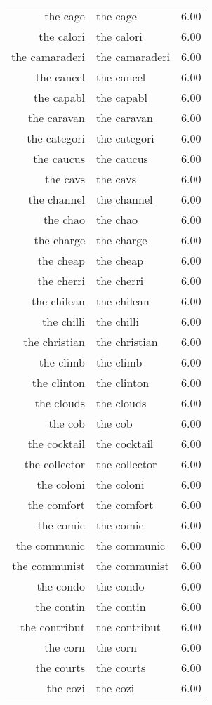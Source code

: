 \begin{table}[ht]
\begin{tabular}{rlr}
  the cage & the cage & 6.00 \\ 
  the calori & the calori & 6.00 \\ 
  the camaraderi & the camaraderi & 6.00 \\ 
  the cancel & the cancel & 6.00 \\ 
  the capabl & the capabl & 6.00 \\ 
  the caravan & the caravan & 6.00 \\ 
  the categori & the categori & 6.00 \\ 
  the caucus & the caucus & 6.00 \\ 
  the cavs & the cavs & 6.00 \\ 
  the channel & the channel & 6.00 \\ 
  the chao & the chao & 6.00 \\ 
  the charge & the charge & 6.00 \\ 
  the cheap & the cheap & 6.00 \\ 
  the cherri & the cherri & 6.00 \\ 
  the chilean & the chilean & 6.00 \\ 
  the chilli & the chilli & 6.00 \\ 
  the christian & the christian & 6.00 \\ 
  the climb & the climb & 6.00 \\ 
  the clinton & the clinton & 6.00 \\ 
  the clouds & the clouds & 6.00 \\ 
  the cob & the cob & 6.00 \\ 
  the cocktail & the cocktail & 6.00 \\ 
  the collector & the collector & 6.00 \\ 
  the coloni & the coloni & 6.00 \\ 
  the comfort & the comfort & 6.00 \\ 
  the comic & the comic & 6.00 \\ 
  the communic & the communic & 6.00 \\ 
  the communist & the communist & 6.00 \\ 
  the condo & the condo & 6.00 \\ 
  the contin & the contin & 6.00 \\ 
  the contribut & the contribut & 6.00 \\ 
  the corn & the corn & 6.00 \\ 
  the courts & the courts & 6.00 \\ 
  the cozi & the cozi & 6.00 \\ 

\end{tabular}
\end{table}
